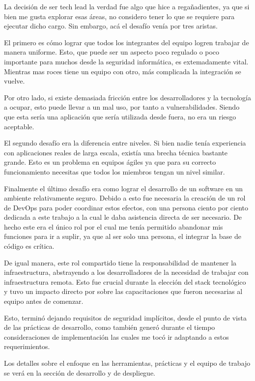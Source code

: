 La decisión de ser tech lead la verdad fue algo que hice a regañadientes, ya que si bien me gusta explorar esas áreas, no considero tener lo que se requiere para ejecutar dicho cargo. Sin embargo, acá el desafío venía por tres aristas.

El primero es cómo lograr que todos los integrantes del equipo logren trabajar de manera uniforme. Esto, que puede ser un aspecto poco regulado o poco importante para muchos desde la seguridad informática, es extemadamente vital. Mientras mas roces tiene un equipo con otro, más complicada la integración se vuelve. 

Por otro lado, si existe demasiada fricción entre los desarrolladores y la tecnología a ocupar, esto puede llevar a un mal uso, por tanto a vulnerabilidades. Siendo que esta sería una aplicación que sería utilizada desde fuera, no era un riesgo aceptable. 

El segundo desafío era la diferencia entre niveles. Si bien nadie tenía experiencia con aplicaciones reales de larga escala, existía una brecha técnica bastante grande. Esto es un problema en equipos ágiles ya que para su correcto funcionamiento necesitas que todos los miembros tengan un nivel similar.

Finalmente el último desafío era como lograr el desarrollo de un software en un ambiente relativamente seguro. Debido a esto fue necesaria la creación de un rol de DevOps para poder coordinar estos efectos, con una persona ciento por ciento dedicada a este trabajo a la cual le daba asistencia directa de ser necesario. De hecho este era el único rol por el cual me tenía permitido abandonar mis funciones para ir a suplir, ya que al ser solo una persona, el integrar la base de código es crítica.

De igual manera, este rol compartido tiene la responsabilidad de mantener la infraestructura, abstrayendo a los desarrolladores de la necesidad de trabajar con infraestructura remota. Esto fue crucial durante la elección del stack tecnológico y tuvo un impacto directo por sobre las capacitaciones que fueron necesarias al equipo antes de comenzar.

Esto, terminó dejando requisitos de seguridad implícitos, desde el punto de vista de las prácticas de desarrollo, como también generó durante el tiempo consideraciones de implementación las cuales me tocó ir adaptando a estos requerimientos.

Los detalles sobre el enfoque en las herramientas, prácticas y el equipo de trabajo se verá en la sección de desarrollo y de despliegue.